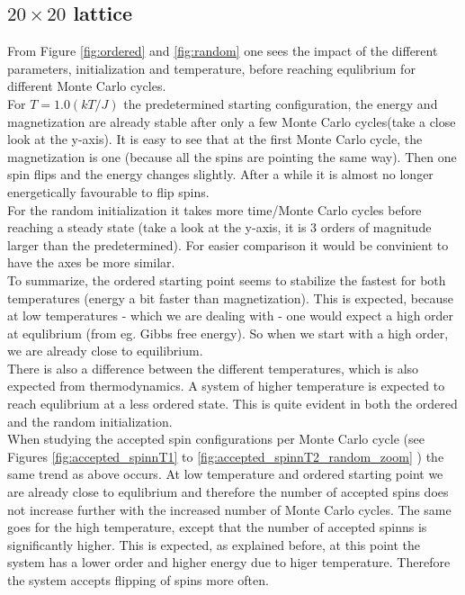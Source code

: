 \documentclass[../main.tex]{subfiles}
\begin{document}
\subsection{$20 \times 20$ lattice}
From Figure \ref{fig:ordered} and \ref{fig:random} one sees the impact of the different parameters, initialization and temperature, before reaching equlibrium for different Monte Carlo cycles. \\
For $T=1.0(kT/J)$ the predetermined starting configuration, the energy and magnetization are already stable after only a few Monte Carlo cycles(take a close look at the y-axis). It is easy to see that at the first Monte Carlo cycle, the magnetization is one (because all the spins are pointing the same way). Then one spin flips and the energy changes slightly. After a while it is almost no longer energetically favourable to flip spins. \\
For the random initialization it takes more time/Monte Carlo cycles before reaching a steady state (take a look at the y-axis, it is 3 orders of magnitude larger than the predetermined). For easier comparison it would be convinient to have the axes be more similar. \\
To summarize, the ordered starting point seems to stabilize the fastest for both temperatures (energy a bit faster than magnetization). This is expected, because at low temperatures - which we are dealing with - one would expect a high order at equlibrium (from eg. Gibbs free energy). So when we start with a high order, we are already close to equilibrium. \\
There is also a difference between the different temperatures, which is also expected from thermodynamics. A system of higher temperature is expected to reach equlibrium at a less ordered state. This is quite evident in both the ordered and the random initialization. \\
When studying the accepted spin configurations per Monte Carlo cycle (see Figures \ref{fig:accepted_spinnT1} to \ref{fig:accepted_spinnT2_random_zoom} ) the same trend as above occurs. At low temperature and ordered starting point we are already close to equlibrium and therefore the number of accepted spins does not increase further with the increased number of Monte Carlo cycles. The same goes for the high temperature, except that the number of accepted spinns is significantly higher. This is expected, as explained before, at this point the system has a lower order and higher energy due to higer temperature. Therefore the system accepts flipping of spins more often.
\end{document}
